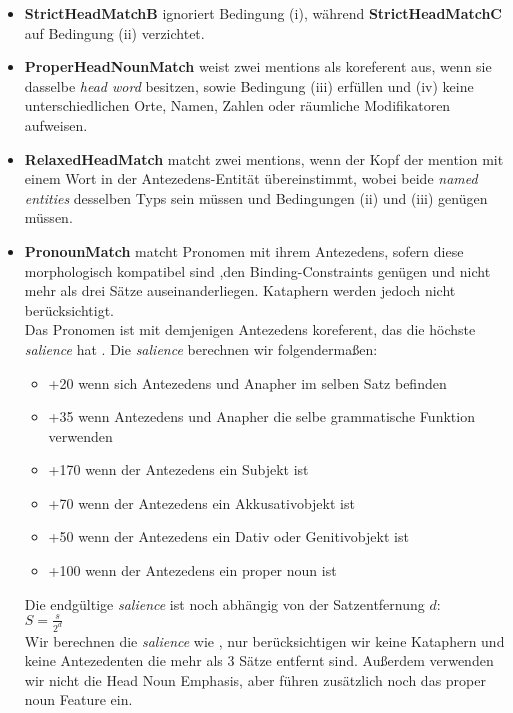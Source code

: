 \documentclass{scrartcl}
\begin{document}
\begin{itemize}
\item \textbf{StrictHeadMatchB} ignoriert Bedingung (i), während \textbf{StrictHeadMatchC}  auf Bedingung (ii) verzichtet.

\item \textbf{ProperHeadNounMatch} weist zwei mentions als koreferent aus, wenn sie dasselbe \textit{head word} besitzen, sowie Bedingung (iii) erfüllen und (iv) keine unterschiedlichen Orte, Namen, Zahlen oder räumliche Modifikatoren aufweisen.

\item \textbf{RelaxedHeadMatch} matcht zwei mentions, wenn der Kopf der mention mit einem Wort in der Antezedens-Entität übereinstimmt, wobei beide \textit{named entities} desselben Typs sein müssen und Bedingungen (ii) und (iii) genügen müssen.

\item \textbf{PronounMatch} matcht Pronomen mit ihrem Antezedens, sofern diese morphologisch kompatibel sind ,den Binding-Constraints genügen und nicht mehr als drei Sätze auseinanderliegen. Kataphern werden jedoch nicht berücksichtigt. \\
Das Pronomen ist mit demjenigen Antezedens koreferent, das die höchste \textit{salience} hat \cite{wunsch2006} . Die \textit{salience} berechnen wir folgendermaßen:

\begin{itemize}[]
	\item +20 wenn sich  Antezedens und Anapher im selben Satz befinden
	
	\item +35 wenn Antezedens und Anapher die selbe grammatische Funktion verwenden
	
	\item +170 wenn der Antezedens ein Subjekt ist
	
	\item +70 wenn der Antezedens ein Akkusativobjekt ist
	
	\item +50 wenn der Antezedens ein Dativ oder Genitivobjekt ist
	
	\item +100 wenn der Antezedens ein proper noun ist
\end{itemize}

Die endgültige \textit{salience} ist noch abhängig von der Satzentfernung $d$: \\
$S = \frac{s}{2^d}$ \\
Wir berechnen die \textit{salience} wie , nur berücksichtigen wir keine Kataphern und keine Antezedenten die mehr als 3 Sätze entfernt sind. Außerdem verwenden wir nicht die Head Noun Emphasis, aber führen zusätzlich noch das proper noun Feature ein.  
\end{itemize}
\end{document}

